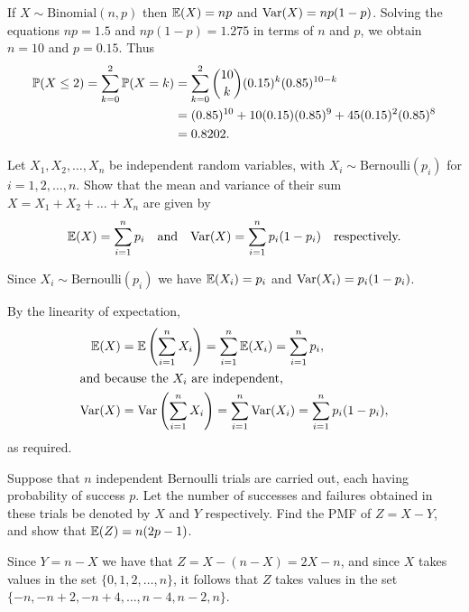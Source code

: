 \begin{exercise}
\begin{questions}
\begin{answer}
If $X\sim\text{Binomial}(n,p)$ then $\mathbb{E}(X)=np$ and $\text{Var}(X)=np(1-p)$. Solving the equations $np=1.5$ and $np(1-p)=1.275$ in terms of $n$ and $p$, we obtain $n=10$ and $p=0.15$. Thus
\begin{align*}
\mathbb{P}(X\leq 2) = \sum_{k=0}^2 \mathbb{P}(X=k)
	& = \sum_{k=0}^2 \binom{10}{k}(0.15)^k (0.85)^{10-k} \\
	& = (0.85)^{10} + 10(0.15)(0.85)^9 + 45(0.15)^2(0.85)^8 \\
	& = 0.8202.
\end{align*}
\end{answer}

\question
Let $X_1,X_2,\ldots,X_n$ be independent random variables, with $X_i\sim\text{Bernoulli}(p_i)$ for $i=1,2,\ldots,n$. Show that the mean and variance of their sum $X=X_1+X_2+\ldots+X_n$ are given by
\[
\mathbb{E}(X) = \displaystyle\sum_{i=1}^n p_i \quad\text{and}\quad \text{Var}(X) = \displaystyle\sum_{i=1}^n p_i(1-p_i) \quad\text{respectively.}
\]
\begin{answer}
Since $X_i\sim\text{Bernoulli}(p_i)$ we have $\mathbb{E}(X_i)=p_i$ and $\text{Var}(X_i)=p_i(1-p_i)$. 

By the linearity of expectation,
\begin{align*}
\mathbb{E}(X)	& = \mathbb{E}\left(\sum_{i=1}^n X_i\right) = \sum_{i=1}^n \mathbb{E}(X_i) = \sum_{i=1}^n p_i, \\
\intertext{and because the $X_i$ are independent,}
\text{Var}(X)	& = \text{Var}\left(\sum_{i=1}^n X_i\right) = \sum_{i=1}^n \text{Var}(X_i) = \sum_{i=1}^n p_i(1-p_i),
\end{align*}
as required.
\end{answer}

\question
Suppose that $n$ independent Bernoulli trials are carried out, each having probability of success $p$. Let the number of successes and failures obtained in these trials be denoted by $X$ and $Y$ respectively. Find the PMF of $Z=X-Y$, and show that $\mathbb{E}(Z)=n(2p-1)$. 
\par
[Hint: use the fact that $Y=n-X$.]
\begin{answer}
Since $Y=n-X$ we have that $Z = X-(n-X) = 2X-n$, and since $X$ takes values in the set $\{0,1,2,\ldots,n\}$, it follows that $Z$ takes values in the set $\{-n,-n+2,-n+4,\ldots,n-4,n-2,n\}$. 


\end{answer}
\end{questions}
\end{exercise}

